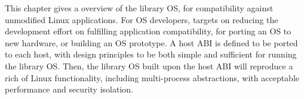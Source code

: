 This chapter gives a overview of the \graphene{} library OS, for compatibility against unmodified Linux applications. For OS developers, \graphene{} targets on reducing the development effort on fulfilling application compatibility,  
for porting an OS to new hardware, or building an OS prototype.
A host ABI is defined to be ported to each host, with design principles to be both simple and sufficient for running the library OS.
Then, the library OS built upon the host ABI
will reproduce a rich of Linux functionality, including multi-process abstractions, with acceptable performance and security isolation.
